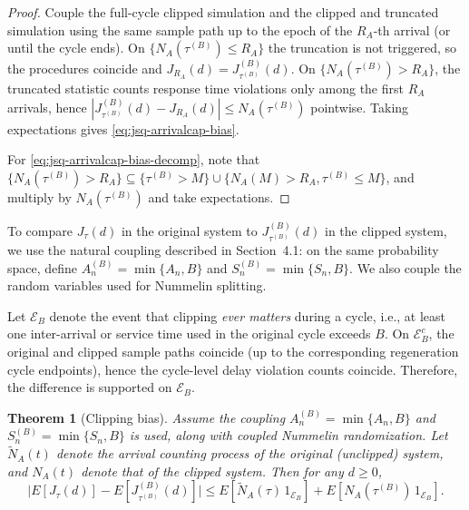 \documentclass[11pt]{article}
\newtheorem{theorem}{Theorem}
\begin{document}
\begin{proof}
Couple the full-cycle clipped simulation and the clipped and truncated
simulation using the same sample path up to the epoch of the $R_A$-th arrival (or
until the cycle ends). On $\{N_A(\tau^{(B)})\le R_A\}$ the truncation is not triggered, so
the procedures coincide and
$J_{R_A}(d)=J_{\tau^{(B)}}^{(B)}(d)$.
On $\{N_A(\tau^{(B)})>R_A\}$, the truncated statistic counts response time violations only among the
first $R_A$ arrivals, hence
$|J_{\tau^{(B)}}^{(B)}(d)-J_{R_A}(d)|\le N_A(\tau^{(B)})$ pointwise.
Taking expectations gives \eqref{eq:jsq-arrivalcap-bias}.

For \eqref{eq:jsq-arrivalcap-bias-decomp}, note that
$\{N_A(\tau^{(B)})>R_A\}\subseteq \{\tau^{(B)}>M\}\cup\{N_A(M)>R_A, \tau^{(B)}\leq M\}$, and multiply
by $N_A(\tau^{(B)})$ and take expectations.
\end{proof}


To compare $J_\tau(d)$ in the original system to $J_{\tau^{(B)}}^{(B)}(d)$ in the
clipped system, we use the natural coupling described in Section~4.1: on the same
probability space, define $A_n^{(B)}=\min\{A_n,B\}$ and $S_n^{(B)}=\min\{S_n,B\}$. We also couple the random variables used for Nummelin splitting.

Let $\mathcal{E}_B$ denote the event that clipping \emph{ever matters} during a
cycle, i.e., at least one inter-arrival or service time used in the original cycle
exceeds $B$. On $\mathcal{E}_B^c$, the original and clipped sample paths coincide
(up to the corresponding regeneration cycle endpoints), hence the cycle-level delay
violation counts coincide. Therefore, the difference is supported on $\mathcal{E}_B$.

\begin{theorem}[Clipping bias]
\label{thm:jsq-clipping-bias}
Assume the coupling $A_n^{(B)}=\min\{A_n,B\}$ and $S_n^{(B)}=\min\{S_n,B\}$ is used, along with coupled Nummelin randomization. Let $\tilde{N}_A(t)$ denote the arrival counting process of the original (unclipped) system, and $N_A(t)$ denote that of the clipped system.
Then for any $d\ge 0$,
\begin{equation}
\label{eq:jsq-clipping-bias}
\bigl|{E}[J_\tau(d)]-{E}[J_{\tau^{(B)}}^{(B)}(d)]\bigr|
\le
{E}\!\left[\tilde{N}_A(\tau)\,{1}_{\mathcal{E}_B}\right]
+
{E}\!\left[N_A(\tau^{(B)})\,{1}_{\mathcal{E}_B}\right].
\end{equation}
\end{theorem}
\end{document}
